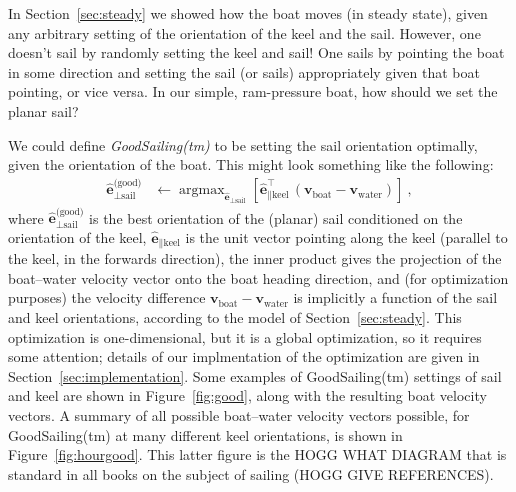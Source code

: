 \documentclass[letterpaper]{article}
\DeclareMathOperator*{\argmax}{argmax}
\renewcommand{\vec}[1]{\boldsymbol{#1}}
\newcommand{\uvec}{\vec{\hat{e}}}
\newcommand{\water}{\text{water}}
\newcommand{\boat}{\text{boat}}
\newcommand{\good}{\text{(good)}}
\newcommand{\sail}{\text{sail}}
\newcommand{\keel}{\text{keel}}
\newcommand{\vwater}{\vec{v}_\water}
\newcommand{\vboat}{\vec{v}_\boat}
\newcommand{\secref}[1]{Section~\ref{#1}}
\newcommand{\figref}[1]{Figure~\ref{#1}}
\begin{document}
In \secref{sec:steady} we showed how the boat moves (in steady state), given any arbitrary setting of the orientation of the keel and the sail.
However, one doesn't sail by randomly setting the keel and sail!
One sails by pointing the boat in some direction and setting the sail (or sails) appropriately given that boat pointing, or vice versa.
In our simple, ram-pressure boat, how should we set the planar sail?

We could define \emph{GoodSailing(tm)} to be setting the sail orientation optimally, given the orientation of the boat.
This might look something like the following:
\begin{align}\label{eq:good}
    \uvec_{\perp\sail}^\good &\leftarrow \argmax_{\uvec_{\perp\sail}} \left[\uvec_{\parallel\keel}^\top\,(\vboat-\vwater)\right] ~,
\end{align}
where $\uvec_{\perp\sail}^\good$ is the best orientation of the (planar) sail conditioned on the orientation of the keel,
$\uvec_{\parallel\keel}$ is the unit vector pointing along the keel (parallel to the keel, in the forwards direction),
the inner product gives the projection of the boat--water velocity vector onto the boat heading direction,
and (for optimization purposes) the velocity difference $\vboat-\vwater$ is implicitly a function of the sail and keel orientations, according to the model of \secref{sec:steady}.
This optimization is one-dimensional, but it is a global optimization, so it requires some attention; details of our implmentation of the optimization are given in \secref{sec:implementation}.
Some examples of GoodSailing(tm) settings of sail and keel are shown in \figref{fig:good}, along with the resulting boat velocity vectors.
A summary of all possible boat--water velocity vectors possible, for GoodSailing(tm) at many different keel orientations, is shown in \figref{fig:hourgood}.
This latter figure is the HOGG WHAT DIAGRAM that is standard in all books on the subject of sailing (HOGG GIVE REFERENCES).
\end{document}
